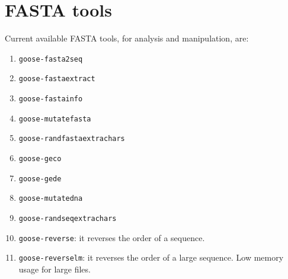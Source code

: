 \chapter{FASTA tools}
\label{fasta}

Current available FASTA tools, for analysis and manipulation, are:
\begin{enumerate}
\item \texttt{goose-fasta2seq}
\item \texttt{goose-fastaextract}
\item \texttt{goose-fastainfo}
\item \texttt{goose-mutatefasta}
\item \texttt{goose-randfastaextrachars}
\item \texttt{goose-geco}
\item \texttt{goose-gede}
\item \texttt{goose-mutatedna}
\item \texttt{goose-randseqextrachars}
\item \texttt{goose-reverse}: it reverses the order of a sequence.
\item \texttt{goose-reverselm}: it reverses the order of a large sequence. Low memory usage for large files.
\end{enumerate}




%
%
%
%
%
%
%
%